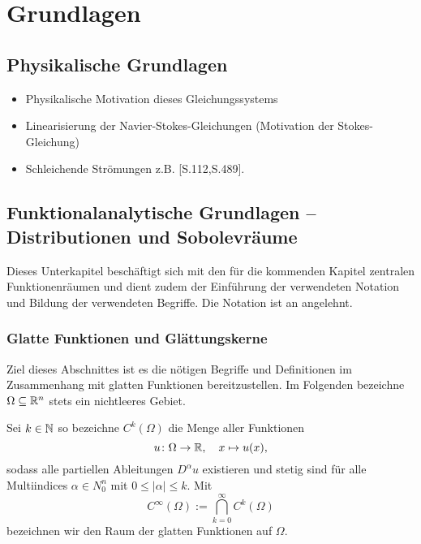 \chapter{Grundlagen}
\label{cp:grundlagen}

\section{Physikalische Grundlagen}

\begin{itemize}
  \item Physikalische Motivation dieses Gleichungssystems
  \item Linearisierung der Navier-Stokes-Gleichungen (Motivation der Stokes-Gleichung)
  \item Schleichende Strömungen z.B. \cite{spurk10stroemungslehre}[S.112,S.489]. 
\end{itemize}

\section{Funktionalanalytische Grundlagen -- Distributionen und Sobolevräume}

Dieses Unterkapitel beschäftigt sich mit den für die kommenden Kapitel zentralen Funktionenräumen und dient zudem der Einführung der verwendeten Notation und Bildung der verwendeten Begriffe.
Die Notation ist an \cite{sohr2001navier} angelehnt.

\subsection{Glatte Funktionen und Glättungskerne}
\label{subsec:smoothMolly}

Ziel dieses Abschnittes ist es die nötigen Begriffe und Definitionen im Zusammenhang mit glatten Funktionen bereitzustellen.
Im Folgenden bezeichne $\Omega \subseteq \mathbb{R}^n$ stets ein nichtleeres Gebiet.

Sei $k \in \mathbb{N}$ so bezeichne $C^k(\Omega)$ die Menge aller Funktionen
$$
u \colon \Omega \to \mathbb{R}, \quad x \mapsto u(x),
$$
sodass alle partiellen Ableitungen $D^\alpha u$ existieren und stetig sind für alle Multiindices $\alpha \in N_0^n$ mit $0 \leq |\alpha| \leq k$. Mit
$$
  C^\infty(\Omega) := \bigcap_{k = 0}^\infty C^k(\Omega)
$$
bezeichnen wir den Raum der glatten Funktionen auf $\Omega$.

